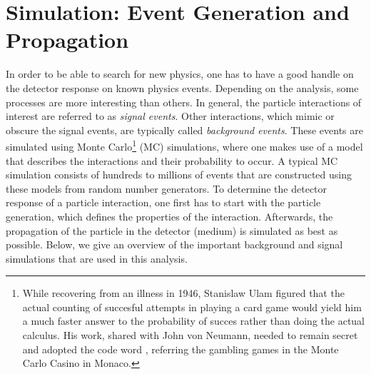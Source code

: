 \chapter{Simulation: Event Generation and Propagation}
In order to be able to search for new physics, one has to have a good handle on the detector response on known physics events. Depending on the analysis, some processes are more interesting than others. In general, the particle interactions of interest are referred to as \textit{signal events}. Other interactions, which mimic or obscure the signal events, are typically called \textit{background events}. These events are simulated using Monte Carlo\footnote{While recovering from an illness in 1946, Stanislaw Ulam figured that the actual counting of succesful attempts in playing a card game would yield him a much faster answer to the probability of succes rather than doing the actual calculus. His work, shared with John von Neumann, needed to remain secret and adopted the code word , referring the gambling games in the Monte Carlo Casino in Monaco.} (MC) simulations, where one makes use of a model that describes the interactions and their probability to occur. A typical MC simulation consists of hundreds to millions of events that are constructed using these models from random number generators. To determine the detector response of a particle interaction, one first has to start with the particle generation, which defines the properties of the interaction. Afterwards, the propagation of the particle in the detector (medium) is simulated as best as possible. Below, we give an overview of the important background and signal simulations that are used in this analysis.

